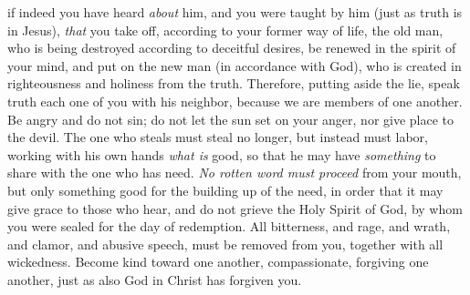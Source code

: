 \begin{biblechapter}
\verse if indeed you have heard \textit{about} him, and you were taught by him (just as truth is in Jesus),
\verse \textit{that} you take off, according to your former way of life, the old man, who is being destroyed according to deceitful desires,
\verse be renewed in the spirit of your mind,
\verse and put on the new man (in accordance with God), who is created in righteousness and holiness from the truth.
 Therefore, putting aside the lie, speak truth each one of you with his neighbor, because we are members of one another.
\verse Be angry and do not sin; do not let the sun set on your anger,
\verse nor give place to the devil.
\verse The one who steals must steal no longer, but instead must labor, working with his own hands \textit{what is} good, so that he may have \textit{something} to share with the one who has need.
\verse \textit{No rotten word must proceed} from your mouth, but only something good for the building up of the need, in order that it may give grace to those who hear,
\verse and do not grieve the Holy Spirit of God, by whom you were sealed for the day of redemption.
\verse All bitterness, and rage, and wrath, and clamor, and abusive speech, must be removed from you, together with all wickedness.
\verse Become kind toward one another, compassionate, forgiving one another, just as also God in Christ has forgiven you.
\end{biblechapter}


